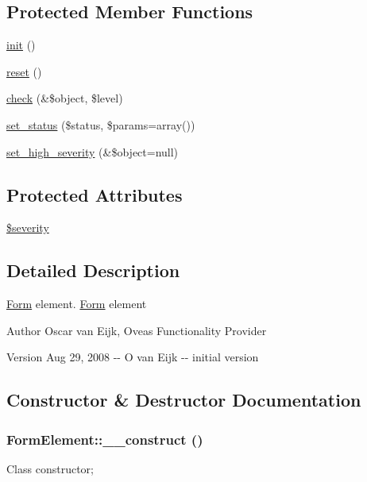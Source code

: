 \subsection*{Protected Member Functions}
\begin{DoxyCompactItemize}
\item 
\hyperlink{class__OWL_ae0ef3ded56e8a6b34b6461e5a721cd3e}{init} ()
\item 
\hyperlink{class__OWL_a2f2a042bcf31965194c03033df0edc9b}{reset} ()
\item 
\hyperlink{class__OWL_ad6f4f6946f40199dd0333cf219fa500e}{check} (\&\$object, \$level)
\item 
\hyperlink{class__OWL_aea912d0ede9b3c2a69b79072d94d4787}{set\_\-status} (\$status, \$params=array())
\item 
\hyperlink{class__OWL_a576829692a3b66e3d518853bf43abae3}{set\_\-high\_\-severity} (\&\$object=null)
\end{DoxyCompactItemize}
\subsection*{Protected Attributes}
\begin{DoxyCompactItemize}
\item 
\hyperlink{class__OWL_ad26b40a9dbbacb33e299b17826f8327c}{\$severity}
\end{DoxyCompactItemize}


\subsection{Detailed Description}
\hyperlink{classForm}{Form} element. \hyperlink{classForm}{Form} element \begin{DoxyAuthor}{Author}
Oscar van Eijk, Oveas Functionality Provider 
\end{DoxyAuthor}
\begin{DoxyVersion}{Version}
Aug 29, 2008 -\/-\/ O van Eijk -\/-\/ initial version 
\end{DoxyVersion}


\subsection{Constructor \& Destructor Documentation}
\subsubsection[{\_\-\_\-construct}]{\setlength{\rightskip}{0pt plus 5cm}FormElement::\_\-\_\-construct ()}\label{classFormElement_af5ecddb99f71fcd2a7b52b2dbcd4c4c5}
Class constructor; 

